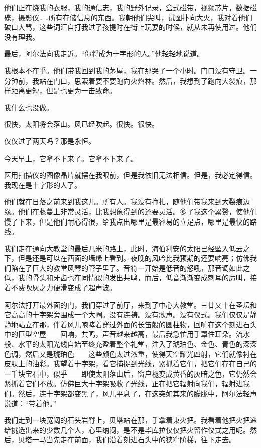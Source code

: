\documentclass[AutoFakeBold=true]{book}
\begin{document}
他们正在烧我的衣服，我的通信志，我的野外记录，盒式磁带，视频芯片，数据磁碟，摄影仪……所有存储信息的东西。我朝他们尖叫，试图扑向大火，我对着他们破口大骂，这些词汇自打我过了孩提时在街上玩耍的时候，就从未再使用过。他们没有理我。

最后，阿尔法向我走近。``你将成为十字形的人。''他轻轻地说道。

我根本不在乎。他们带我回到我的茅屋，我在那哭了一个小时。门口没有守卫。一分钟前，我站在门口，思索着要不要跑向火焰林。然后，我想到了跑向大裂痕，那样距离更短，但是也更为一击致命。

我什么也没做。

很快，太阳将会落山。风已经吹起。很快。很快。

\vspace*{1em}{\kaishu 第一百一十二日：}

仅仅过了两天吗？那是永恒。

今天早上，它拿不下来了。它拿不下来了。

医用扫描仪的图像晶片就摆在我眼前，但是我依旧无法相信。但是，我必定得信。我现在是十字形的人了。

他们就在日落之前来到我这儿。所有人。我没有挣扎，随他们带我来到大裂痕边缘。他们在藤蔓上非常灵活，比我想象得到的还要灵活。多了我这个累赘，使他们慢了下来，但是他们耐心得很，给我点出哪里是最容易的立足点，哪里是最快的路线。

我们走在通向大教堂的最后几米的路上，此时，海伯利安的太阳已经坠入低云之下，但是还是可以在西面的墙缘上看到。夜晚的风吟比我预期的还要响亮；仿佛我们陷在了巨大的教堂风琴的管子里了。音符一开始是低音的怒吼，那音调如此之低，我的骨头和牙齿也在同情似的发出共鸣，而后，低音渐渐变成刺耳的厉叫，接着不费吹灰之力便滑变成了超声波。

阿尔法打开最外面的门，我们穿过了前厅，来到了中心大教堂。三廿又十在圣坛和它高高的十字架旁围成一个大圈。没有连祷。没有歌声。没有仪式。我们仅仅是静静地站立在那，伴着风儿咆哮着穿过外面的长笛般的圆柱物，回响在这个刻进石头中的巨型空屋——回响，共鸣，声音越来越高，最后我急忙用手罩住耳朵。流水般、水平的太阳光线自始至终充盈着整个礼堂，注入了琥珀色、金色、青色的深深色调，然后又是琥珀色——这些颜色太过浓重，使得天空耀光四射，它们就像衬在皮肤上的油彩。我望着十字架，看它捕捉到光线，紧抓着它们，把它们存在自己的一千块宝石中，似乎——即使太阳落山后，窗户褪变成黄昏的灰暗之色，它仍然会紧抓着它们不放。仿佛巨大十字架吸收了光线，正在把它辐射向我们，辐射进我们。然后，连十字架都变黑了，风儿平息了，在这突如其来的朦胧中，阿尔法轻声说道：``带着他。''

我们走到一块宽阔的石头岩脊上，贝塔站在那，手拿着束火把。我看着他把火把递给挑选出来的少数几个人，心里纳闷，是不是毕库拉仅仅把火留作仪式之用呢。然后，贝塔一马当先走在前面，我们沿着刻进石头中的狭窄阶梯，往下走去。
\end{document}
